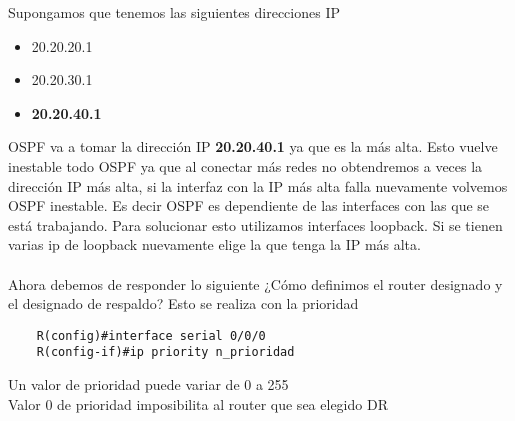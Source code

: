 Supongamos que tenemos las siguientes direcciones IP
\begin{itemize}
    \item 20.20.20.1 
    \item 20.20.30.1
    \item \textbf{20.20.40.1}
\end{itemize}
OSPF va a tomar la dirección IP \textbf{20.20.40.1} ya que es la más alta. Esto vuelve inestable todo OSPF ya que al conectar más redes no obtendremos a veces la dirección IP más alta, si la interfaz con la IP más alta falla nuevamente volvemos OSPF inestable. Es decir OSPF es dependiente de las interfaces con las que se está trabajando. Para solucionar esto utilizamos interfaces loopback.
Si se tienen varias ip de loopback nuevamente elige la que tenga la IP más alta.\\\\

Ahora debemos de responder lo siguiente ¿Cómo definimos el router designado y el designado de respaldo? Esto se realiza con la prioridad 
\begin{lstlisting}
    R(config)#interface serial 0/0/0
    R(config-if)#ip priority n_prioridad
\end{lstlisting}
Un valor de prioridad puede variar de 0 a 255 \\

Valor 0 de prioridad imposibilita al router que sea elegido DR \\